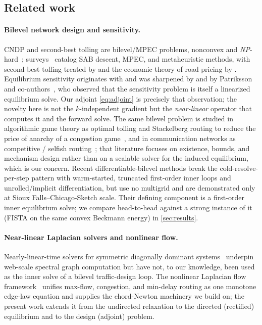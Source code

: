 \documentclass[ijoc]{informs3}
\begin{document}
\subsection{Related work}\label{sec:related}
\paragraph{Bilevel network design and sensitivity.}
CNDP and second-best tolling are bilevel/MPEC problems, nonconvex and \emph{NP}-hard~\citep{gairing2017,hoefer2008};
surveys~\citep{farahani2013} catalog SAB descent, MPEC, and metaheuristic methods, with second-best tolling
treated by \citet{lawphongpanich2004} and the economic theory of road pricing by \citet{yanghuang2005}.
Equilibrium sensitivity originates with \citet{tobinfriesz1988} and was sharpened by \citet{qiumagnanti1989}
and by Patriksson and co-authors~\citep{jp2007}, who observed that the sensitivity problem is itself a
linearized equilibrium solve.
Our adjoint \cref{eq:adjoint} is precisely that observation; the novelty here is not the $k$-independent gradient
but the \emph{near-linear} operator that computes it and the forward solve. The same bilevel problem is studied
in algorithmic game theory as optimal tolling and Stackelberg routing to reduce the price of anarchy of a
congestion game~\citep{roughgarden2002,swamy2012,korilis1997,cole2003}, and in communication networks as competitive /
selfish routing~\citep{orda1993,larroca2013}; that literature focuses on existence, bounds, and mechanism design
rather than on a scalable solver for the induced equilibrium, which is our concern. Recent differentiable-bilevel
methods
\citep{li2022,goyal2023} break the cold-resolve-per-step pattern with warm-started, truncated first-order inner
loops and unrolled/implicit differentiation, but use no multigrid and are demonstrated only at Sioux
Falls--Chicago-Sketch scale. Their defining component is a first-order inner equilibrium solve; we compare
head-to-head against a strong instance of it (FISTA on the same convex Beckmann energy) in \cref{sec:results}.

\paragraph{Near-linear Laplacian solvers and nonlinear flow.}
Nearly-linear-time solvers for symmetric diagonally dominant systems~\citep{kyngsachdeva2016,lamgplus} underpin
web-scale spectral graph computation but have not, to our knowledge, been used as the inner solve of a bilevel
traffic-design loop. The nonlinear Laplacian flow framework~\citep{nlf} unifies max-flow, congestion, and
min-delay routing as one monotone edge-law equation and supplies the chord-Newton machinery we build on;
the present work extends it from the undirected relaxation to the directed (rectified) equilibrium and to the
design (adjoint) problem.
\end{document}

